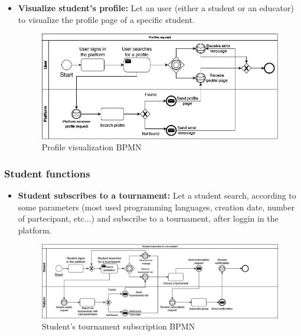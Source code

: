 \documentclass{article}
\begin{document}
{\begin{itemize}
            \item \textbf{Visualize student's profile:} Let an user (either a student or an educator) to visualize the profile page of a specific student.
            \begin{figure}[H]
                \centering
                \includegraphics[scale=0.4]{images/BPMN/Profile_request.png}
                \caption{Profile visualization BPMN}
                \label{fig:profileVisualizationBPMN}
            \end{figure}
        \end{itemize}

    \subsubsection{Student functions}
        \begin{itemize}
            \item \textbf{Student subscribes to a tournament:} Let a student search, according to some parameters (most used programming languages, creation date, number of partecipant, etc...) and subscribe to a tournament, after loggin in the platform.
            \begin{figure}[H]
                \centering
                \hspace*{-1.85cm}\includegraphics[scale=0.4]{images/BPMN/Tournament_subscription.png}
                \caption{Student's tournament subscription BPMN}
                \label{fig:studTournamentSubBPMN}
            \end{figure}


\end{itemize}}
\end{document}
